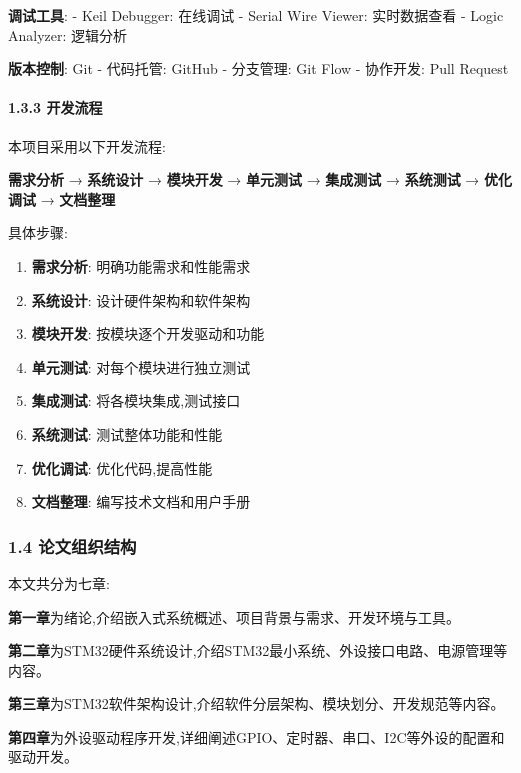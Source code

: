 \documentclass[
]{article}
\providecommand{\tightlist}{%
  \setlength{\itemsep}{0pt}\setlength{\parskip}{0pt}}
\begin{document}
\textbf{调试工具}: - Keil Debugger: 在线调试 - Serial Wire Viewer:
实时数据查看 - Logic Analyzer: 逻辑分析

\textbf{版本控制}: Git - 代码托管: GitHub - 分支管理: Git Flow -
协作开发: Pull Request

\hypertarget{ux5f00ux53d1ux6d41ux7a0b}{%
\paragraph{1.3.3 开发流程}\label{ux5f00ux53d1ux6d41ux7a0b}}

本项目采用以下开发流程:

\textbf{需求分析} → \textbf{系统设计} → \textbf{模块开发} →
\textbf{单元测试} → \textbf{集成测试} → \textbf{系统测试} →
\textbf{优化调试} → \textbf{文档整理}

具体步骤:

\begin{enumerate}
\def\labelenumi{\arabic{enumi}.}
\tightlist
\item
  \textbf{需求分析}: 明确功能需求和性能需求
\item
  \textbf{系统设计}: 设计硬件架构和软件架构
\item
  \textbf{模块开发}: 按模块逐个开发驱动和功能
\item
  \textbf{单元测试}: 对每个模块进行独立测试
\item
  \textbf{集成测试}: 将各模块集成,测试接口
\item
  \textbf{系统测试}: 测试整体功能和性能
\item
  \textbf{优化调试}: 优化代码,提高性能
\item
  \textbf{文档整理}: 编写技术文档和用户手册
\end{enumerate}

\hypertarget{ux8bbaux6587ux7ec4ux7ec7ux7ed3ux6784}{%
\subsubsection{1.4
论文组织结构}\label{ux8bbaux6587ux7ec4ux7ec7ux7ed3ux6784}}

本文共分为七章:

\textbf{第一章}为绪论,介绍嵌入式系统概述、项目背景与需求、开发环境与工具。

\textbf{第二章}为STM32硬件系统设计,介绍STM32最小系统、外设接口电路、电源管理等内容。

\textbf{第三章}为STM32软件架构设计,介绍软件分层架构、模块划分、开发规范等内容。

\textbf{第四章}为外设驱动程序开发,详细阐述GPIO、定时器、串口、I2C等外设的配置和驱动开发。
\end{document}
